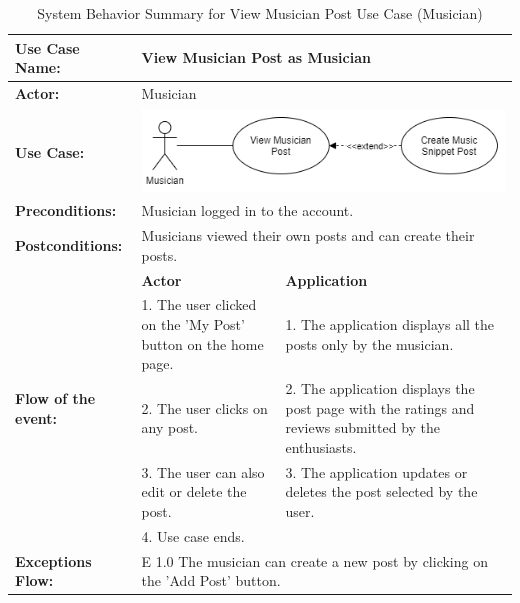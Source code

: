\begin{longtable}{|p{3cm}|p{5cm}|p{5cm}|}
    \caption{System Behavior Summary for View Musician Post Use Case (Musician)} \\
    \hline
    \textbf{Use Case Name:} & \multicolumn{2}{l|}{View Musician Post as Musician} \\ \hline
    \textbf{Actor:} & \multicolumn{2}{l|}{Musician} \\ \hline
    \textbf{Use Case:} & \multicolumn{2}{l|}{\includegraphics[width=0.5\linewidth]{mainmatter/images/sucd5.png}} \\ \hline
    \textbf{Preconditions:} & \multicolumn{2}{p{10cm}|}{Musician logged in to the account.} \\ \hline
    \textbf{Postconditions:} & \multicolumn{2}{p{10cm}|}{Musicians viewed their own posts and can create their posts.} \\ \hline
    \multirow{5}{3cm}{\raggedright \textbf{Flow of the event:}} & \textbf{Actor} & \textbf{Application} \\ \cline{2-3}
    & 1. The user clicked on the 'My Post' button on the home page. & 1. The application displays all the posts only by the musician. \\ \cline{2-3}
    & 2. The user clicks on any post. & 2. The application displays the post page with the ratings and reviews submitted by the enthusiasts. \\ \cline{2-3}
    & 3. The user can also edit or delete the post. & 3. The application updates or deletes the post selected by the user.  \\ \cline{2-3}
    & 4. Use case ends. &  \\ \hline
    \multirow{1}{3cm}{\raggedright \textbf{Exceptions Flow:}} & \multicolumn{2}{p{10cm}|}{\raggedright E 1.0 The musician can create a new post by clicking on the 'Add Post' button.} \\ \hline
\end{longtable}
\pagebreak

